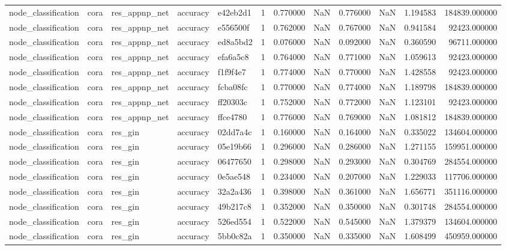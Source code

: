 \begin{tabular}{lllllrrrrrrr}
node_classification & cora & res_appnp_net & accuracy & e42eb2d1 & 1 & 0.770000 & NaN & 0.776000 & NaN & 1.194583 & 184839.000000 \\
node_classification & cora & res_appnp_net & accuracy & e556500f & 1 & 0.762000 & NaN & 0.767000 & NaN & 0.941584 & 92423.000000 \\
node_classification & cora & res_appnp_net & accuracy & ed8a5bd2 & 1 & 0.076000 & NaN & 0.092000 & NaN & 0.360590 & 96711.000000 \\
node_classification & cora & res_appnp_net & accuracy & efa6a5c8 & 1 & 0.764000 & NaN & 0.771000 & NaN & 1.059613 & 92423.000000 \\
node_classification & cora & res_appnp_net & accuracy & f1f9f4e7 & 1 & 0.774000 & NaN & 0.770000 & NaN & 1.428558 & 92423.000000 \\
node_classification & cora & res_appnp_net & accuracy & fcba08fc & 1 & 0.770000 & NaN & 0.774000 & NaN & 1.189798 & 184839.000000 \\
node_classification & cora & res_appnp_net & accuracy & ff20303c & 1 & 0.752000 & NaN & 0.772000 & NaN & 1.123101 & 92423.000000 \\
node_classification & cora & res_appnp_net & accuracy & ffce4780 & 1 & 0.776000 & NaN & 0.769000 & NaN & 1.081812 & 184839.000000 \\
node_classification & cora & res_gin & accuracy & 02dd7a4c & 1 & 0.160000 & NaN & 0.164000 & NaN & 0.335022 & 134604.000000 \\
node_classification & cora & res_gin & accuracy & 05e19b66 & 1 & 0.296000 & NaN & 0.286000 & NaN & 1.271155 & 159951.000000 \\
node_classification & cora & res_gin & accuracy & 06477650 & 1 & 0.298000 & NaN & 0.293000 & NaN & 0.304769 & 284554.000000 \\
node_classification & cora & res_gin & accuracy & 0e5ae548 & 1 & 0.234000 & NaN & 0.207000 & NaN & 1.229033 & 117706.000000 \\
node_classification & cora & res_gin & accuracy & 32a2a436 & 1 & 0.398000 & NaN & 0.361000 & NaN & 1.656771 & 351116.000000 \\
node_classification & cora & res_gin & accuracy & 49b217c8 & 1 & 0.352000 & NaN & 0.350000 & NaN & 0.301748 & 284554.000000 \\
node_classification & cora & res_gin & accuracy & 526ed554 & 1 & 0.522000 & NaN & 0.545000 & NaN & 1.379379 & 134604.000000 \\
node_classification & cora & res_gin & accuracy & 5bb0c82a & 1 & 0.350000 & NaN & 0.335000 & NaN & 1.608499 & 450959.000000 \\

\end{tabular}
